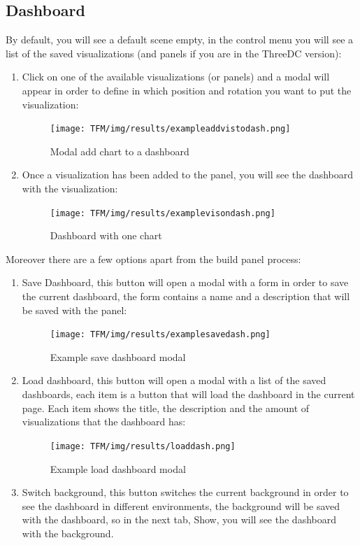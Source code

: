 \documentclass[a4paper, 12pt]{book}
\begin{document}
\subsection{Dashboard}
By default, you will see a default scene empty, in the control menu you will see a list of the saved visualizations (and panels if you are in the ThreeDC version):

\begin{enumerate}
    \item Click on one of the available visualizations (or panels) and a modal will appear in order to define in which position and rotation you want to put the visualization:
    \begin{figure}[H]
      \centering
      \texttt{[image: TFM/img/results/exampleaddvistodash.png]}
      \caption{Modal add chart to a dashboard}
      \label{fig:onlynodes}
    \end{figure}
    \item Once a visualization has been added to the panel, you will see the dashboard with the visualization:
    \begin{figure}[H]
      \centering
      \texttt{[image: TFM/img/results/examplevisondash.png]}
      \caption{Dashboard with one chart}
      \label{fig:onlynodes}
    \end{figure}
\end{enumerate}

Moreover there are a few options apart from the build panel process:
\begin{enumerate}
    \item Save Dashboard, this button will open a modal with a form in order to save the current dashboard, the form contains a name and a description that will be saved with the panel:
    \begin{figure}[H]
      \centering
      \texttt{[image: TFM/img/results/examplesavedash.png]}
      \caption{Example save dashboard modal}
      \label{fig:onlynodes}
    \end{figure}
   \item Load dashboard, this button will open a modal with a list of the saved dashboards, each item is a button that will load the dashboard in the current page. Each item shows the title, the description and the amount of visualizations that the dashboard has:
    \begin{figure}[H]
      \centering
      \texttt{[image: TFM/img/results/loaddash.png]}
      \caption{Example load dashboard modal}
      \label{fig:onlynodes}
    \end{figure}
    \item Switch background, this button switches the current background in order to see the dashboard in different environments, the background will be saved with the dashboard, so in the next tab, Show, you will see the dashboard with the background.
\end{enumerate}
\end{document}
